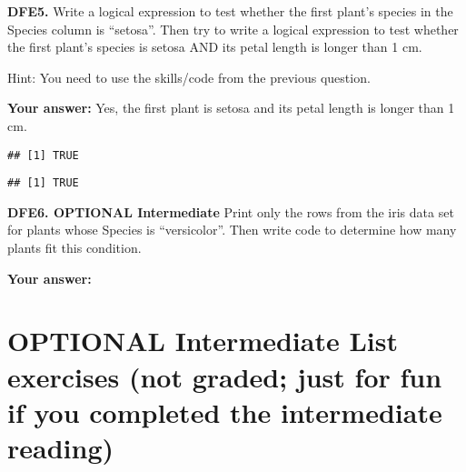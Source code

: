 \documentclass[
]{article}
\newenvironment{Shaded}{\begin{snugshade}}{\end{snugshade}}
\newcommand{\CommentTok}[1]{\textcolor[rgb]{0.56,0.35,0.01}{\textit{#1}}}
\newcommand{\DecValTok}[1]{\textcolor[rgb]{0.00,0.00,0.81}{#1}}
\newcommand{\NormalTok}[1]{#1}
\newcommand{\SpecialCharTok}[1]{\textcolor[rgb]{0.00,0.00,0.00}{#1}}
\newcommand{\StringTok}[1]{\textcolor[rgb]{0.31,0.60,0.02}{#1}}
\begin{document}
\textbf{DFE5.} Write a logical expression to test whether the first
plant's species in the Species column is ``setosa''. Then try to write a
logical expression to test whether the first plant's species is setosa
AND its petal length is longer than 1 cm.

Hint: You need to use the skills/code from the previous question.

\textbf{Your answer:} Yes, the first plant is setosa and its petal
length is longer than 1 cm.

\begin{Shaded}
\end{Shaded}

\begin{verbatim}
## [1] TRUE
\end{verbatim}

\begin{Shaded}
\end{Shaded}

\begin{verbatim}
## [1] TRUE
\end{verbatim}

\textbf{DFE6. OPTIONAL Intermediate} Print only the rows from the iris
data set for plants whose Species is ``versicolor''. Then write code to
determine how many plants fit this condition.

\textbf{Your answer:}

\hypertarget{optional-intermediate-list-exercises-not-graded-just-for-fun-if-you-completed-the-intermediate-reading}{%
\section{OPTIONAL Intermediate List exercises (not graded; just for fun
if you completed the intermediate
reading)}\label{optional-intermediate-list-exercises-not-graded-just-for-fun-if-you-completed-the-intermediate-reading}}
\end{document}
